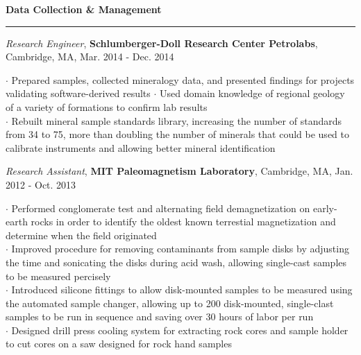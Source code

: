 \documentclass[11pt]{article}
\begin{document}
\vspace*{0.25 mm}
\textbf{Data Collection \& Management}
\smallskip
\hrule
\emph{Research Engineer}, \textbf {Schlumberger-Doll Research Center Petrolabs}, Cambridge, MA, Mar. 2014 - Dec. 2014 \\ 
\begin{small}$\cdot$ {Prepared samples, collected mineralogy data, and presented findings for projects validating software-derived results}
$\cdot$ {Used domain knowledge of regional geology of a variety of formations to confirm lab results}\\
$\cdot$ {Rebuilt mineral sample standards library, increasing the number of standards from 34 to 75, more than doubling the number of minerals that could be used to calibrate instruments and allowing better mineral identification}\end{small} 

\smallskip
\emph {Research Assistant}, \textbf {MIT Paleomagnetism Laboratory}, Cambridge, MA, Jan. 2012 - Oct. 2013 \\ 
\begin{small}$\cdot$ {Performed conglomerate test and alternating field demagnetization on early-earth rocks in order to identify the oldest known terrestial magnetization and determine when the field originated} \\
$\cdot$ {Improved procedure for removing contaminants from sample disks by adjusting the time and sonicating the disks during acid wash, allowing single-cast samples to be measured percisely} \\
$\cdot$ {Introduced silicone fittings to allow disk-mounted samples to be measured using the automated sample changer, allowing up to 200 disk-mounted, single-clast samples to be run in sequence and saving over 30 hours of labor per run} \\
$\cdot$ {Designed drill press cooling system for extracting rock cores and sample holder to cut cores on a saw designed for rock hand samples}\end{small}
\end{document}
